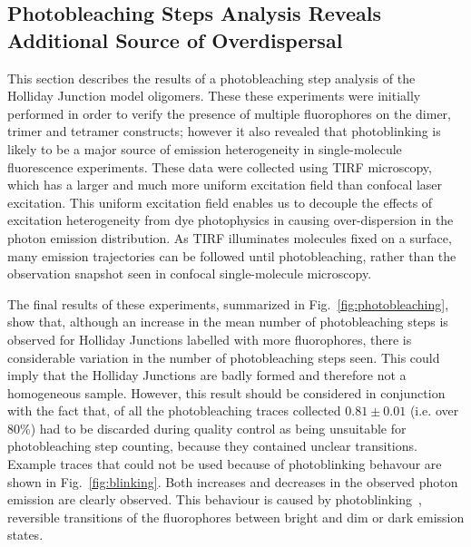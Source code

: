 \subsection{Photobleaching Steps Analysis Reveals Additional Source of Overdispersal}
This section describes the results of a photobleaching step analysis of the Holliday Junction model oligomers. These these experiments were initially performed in order to verify the presence of multiple fluorophores on the dimer, trimer and tetramer constructs; however it also revealed that photoblinking is likely to be a major source of emission heterogeneity in single-molecule fluorescence experiments. These data were collected using TIRF microscopy, which has a larger and much more uniform excitation field than confocal laser excitation. This uniform excitation field enables us to decouple the effects of excitation heterogeneity from dye photophysics in causing over-dispersion in the photon emission distribution. As TIRF illuminates molecules fixed on a surface,  many emission trajectories can be followed until photobleaching, rather than the observation snapshot seen in confocal single-molecule microscopy.  

The final results of these experiments, summarized in Fig.~\ref{fig:photobleaching}, show that, although  an increase in the mean number of photobleaching steps is observed for Holliday Junctions labelled with more fluorophores, there is considerable variation in the number of photobleaching steps seen. This could imply that the Holliday Junctions are badly formed and therefore not a homogeneous sample. However, this result should be considered in conjunction with the fact that, of all the photobleaching traces collected $0.81 \pm 0.01$ (i.e. over 80\%) had to be discarded during quality control as being unsuitable for photobleaching step counting, because they contained unclear transitions. Example traces that could not be used because of photoblinking behavour are shown in Fig.~\ref{fig:blinking}. Both increases and decreases in the observed photon emission are clearly observed. This behaviour is caused by photoblinking~\cite{zondervan03}, reversible transitions of the fluorophores between bright and dim or dark emission states.

